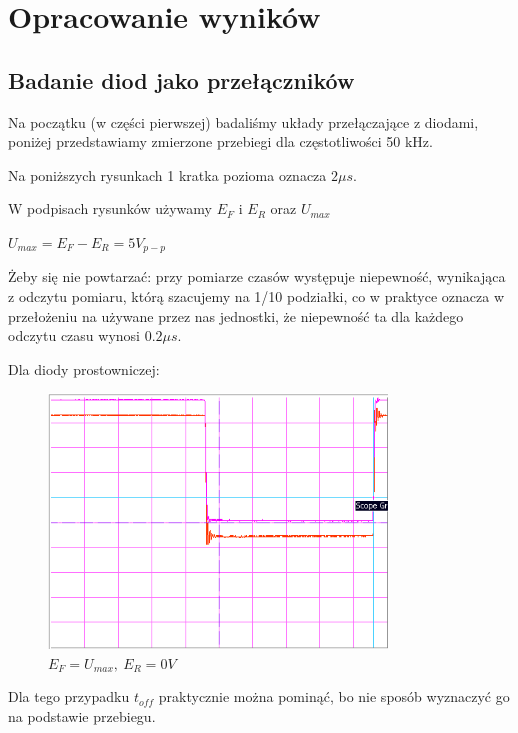 \documentclass[a4paper,11pt]{article}
\begin{document}
\section{Opracowanie wyników}


\subsection{Badanie diod jako przełączników}
Na początku (w części pierwszej) badaliśmy układy przełączające z diodami, poniżej przedstawiamy zmierzone przebiegi dla częstotliwości 50 kHz.

Na poniższych rysunkach 1 kratka pozioma oznacza \(2 \mu s\).

W podpisach rysunków używamy \(E_F \) i \(E_R \) oraz \(U_{max} \)

\(U_{max} = E_F - E_R = 5V_{p-p}\)


Żeby się nie powtarzać: przy pomiarze czasów występuje niepewność, wynikająca z odczytu pomiaru, którą szacujemy na 1/10 podziałki, co w praktyce oznacza w przełożeniu na używane przez nas jednostki, że niepewność ta dla każdego odczytu czasu wynosi \(0.2 \mu s\).

Dla diody prostowniczej:

\begin{figure} [H]
  \begin{center}
    \includegraphics[width = 9cm]{../Obrazki_i_tekst/obrobione/1asciety.png}
    \caption{\( E_F = U_{max}, \ E_R = 0V \)}
  \end{center}
\end{figure}

Dla tego przypadku \( t_{off} \) praktycznie można pominąć, bo nie sposób wyznaczyć go na podstawie przebiegu.
\end{document}
